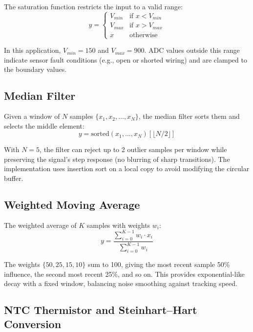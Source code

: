 \documentclass[12pt]{article}
\begin{document}
The saturation function restricts the input to a valid range:
\begin{equation}
y = \begin{cases}
V_{min} & \text{if } x < V_{min} \\
V_{max} & \text{if } x > V_{max} \\
x       & \text{otherwise}
\end{cases}
\label{eq:saturation}
\end{equation}

In this application, $V_{min} = 150$ and $V_{max} = 900$. ADC values outside this range indicate sensor fault conditions (e.g., open or shorted wiring) and are clamped to the boundary values.

\subsection{Median Filter}

Given a window of $N$ samples $\{x_1, x_2, \ldots, x_N\}$, the median filter sorts them and selects the middle element:
\begin{equation}
y = \text{sorted}(x_1, \ldots, x_N)\!\left[\lfloor N/2 \rfloor\right]
\label{eq:median}
\end{equation}

With $N = 5$, the filter can reject up to 2 outlier samples per window while preserving the signal's step response (no blurring of sharp transitions). The implementation uses insertion sort on a local copy to avoid modifying the circular buffer.

\subsection{Weighted Moving Average}

The weighted average of $K$ samples with weights $w_i$:
\begin{equation}
y = \frac{\sum_{i=0}^{K-1} w_i \cdot x_i}{\sum_{i=0}^{K-1} w_i}
\label{eq:wavg}
\end{equation}

The weights $\{50, 25, 15, 10\}$ sum to 100, giving the most recent sample 50\% influence, the second most recent 25\%, and so on. This provides exponential-like decay with a fixed window, balancing noise smoothing against tracking speed.

\subsection{NTC Thermistor and Steinhart--Hart Conversion}
\end{document}
